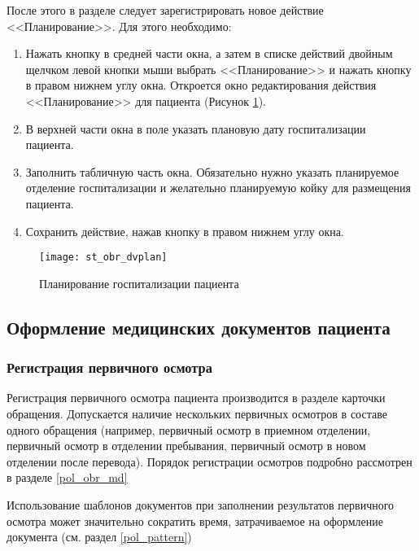 После этого в разделе  следует зарегистрировать новое действие <<Планирование>>. Для этого необходимо:
\begin{enumerate}
 \item Нажать кнопку  в средней части окна, а затем в списке действий двойным щелчком левой кнопки мыши выбрать <<Планирование>> и нажать кнопку   в правом нижнем углу окна. Откроется окно редактирования действия <<Планирование>> для пациента (Рисунок \ref{img_st_obr_dvplan}).
 \item В верхней части окна в поле  указать плановую дату госпитализации пациента.
 \item Заполнить табличную часть окна. Обязательно нужно указать планируемое отделение госпитализации и желательно планируемую койку для размещения пациента.
 \item Сохранить действие, нажав кнопку   в правом нижнем углу окна.
\end{enumerate}

\begin{figure}[ht]\centering
   \texttt{[image: st\_obr\_dvplan]}
   \caption{Планирование госпитализации пациента}
   \label{img_st_obr_dvplan}
\end{figure} 

\subsection{Оформление медицинских документов пациента} \label{st_obr_md}

\subsubsection{Регистрация первичного осмотра}

Регистрация первичного осмотра пациента производится в разделе  карточки обращения. Допускается наличие нескольких первичных осмотров в составе одного обращения (например, первичный осмотр в приемном отделении, первичный осмотр в отделении пребывания, первичный осмотр в новом отделении после перевода). Порядок регистрации осмотров подробно рассмотрен в разделе \ref{pol_obr_md}

\begin{prim}
 Использование шаблонов документов при заполнении результатов первичного осмотра может значительно сократить время, затрачиваемое на оформление документа (см. раздел \ref{pol_pattern})
\end{prim}


